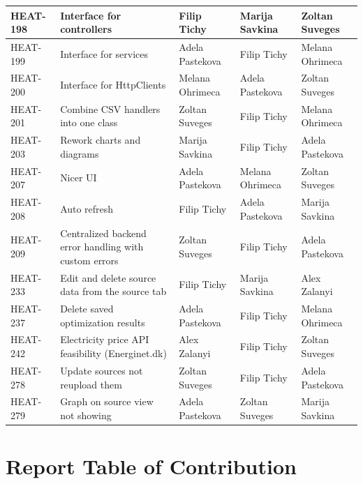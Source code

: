 \begin{longtable}{|p{1.5cm}|p{4.5cm}|p{2.8cm}|p{2.6cm}|p{2.6cm}|}
HEAT-198 & Interface for controllers & Filip Tichy & Marija Savkina & Zoltan Suveges \\ \hline
HEAT-199 & Interface for services & Adela Pastekova & Filip Tichy & Melana Ohrimeca \\ \hline
HEAT-200 & Interface for HttpClients & Melana Ohrimeca & Adela Pastekova & Zoltan Suveges \\ \hline
HEAT-201 & Combine CSV handlers into one class & Zoltan Suveges & Filip Tichy & Melana Ohrimeca \\ \hline
HEAT-203 & Rework charts and diagrams & Marija Savkina & Filip Tichy & Adela Pastekova \\ \hline
HEAT-207 & Nicer UI & Adela Pastekova & Melana Ohrimeca & Zoltan Suveges \\ \hline
HEAT-208 & Auto refresh & Filip Tichy & Adela Pastekova & Marija Savkina \\ \hline
HEAT-209 & Centralized backend error handling with custom errors & Zoltan Suveges & Filip Tichy & Adela Pastekova \\ \hline
HEAT-233 & Edit and delete source data from the source tab & Filip Tichy & Marija Savkina & Alex Zalanyi \\ \hline
HEAT-237 & Delete saved optimization results & Adela Pastekova & Filip Tichy & Melana Ohrimeca \\ \hline
HEAT-242 & Electricity price API feasibility (Energinet.dk) & Alex Zalanyi & Filip Tichy & Zoltan Suveges \\ \hline
HEAT-278 & Update sources not reupload them & Zoltan Suveges & Filip Tichy & Adela Pastekova \\ \hline
HEAT-279 & Graph on source view not showing & Adela Pastekova & Zoltan Suveges & Marija Savkina \\ \hline
\end{longtable}


\clearpage
\chapter{Report Table of Contribution}
\mbox{} %

\setlength{\LTleft}{\fill}
\setlength{\LTright}{\fill}
\renewcommand{\arraystretch}{1.3}

